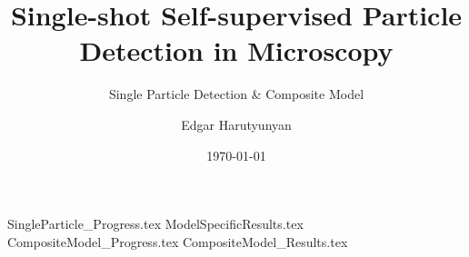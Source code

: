 \documentclass[aspectratio=\BeamerAspectRatio]{beamer}
\title[LodeSTAR Project]{Single-shot Self-supervised Particle Detection in Microscopy}
\subtitle[]{Single Particle Detection \& Composite Model}
\author{Edgar Harutyunyan}
\institute
{Molecular Nanophotonics Group\\
Peter Debye Institute for Soft Matter Physics\\
Universit\"at Leipzig}
\date{\today}
\begin{document}
\maketitlepage %
\maketableofcontents %
\makesectionpopup %

{SingleParticle_Progress.tex}
{ModelSpecificResults.tex}
{CompositeModel_Progress.tex}
{CompositeModel_Results.tex}
\end{document}

